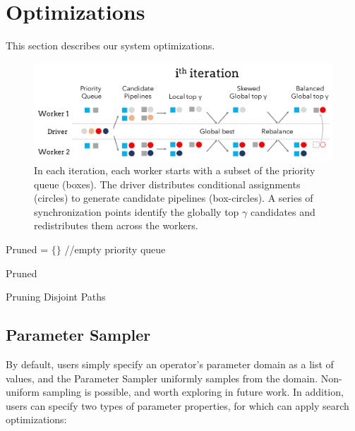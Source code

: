 \section{Optimizations}\label{s:search}
This section describes our system optimizations.

\begin{figure}[t]
    \centering
    \includegraphics[width=\columnwidth]{figures/distributed.pdf}
    \caption{In each iteration, each worker starts with a subset of the priority queue (boxes).  The driver distributes conditional assignments (circles) to generate candidate pipelines (box-circles).  A series of synchronization points identify the globally top $\gamma$ candidates and redistributes them across the workers.   \label{fig:algo}}
\end{figure}


{
\begin{algorithm}[t]

 Pruned = $\{\}$  //empty priority queue



\Return Pruned
\caption{Pruning Disjoint Paths}
\label{alg:pruning}
\end{algorithm}
}


\subsection{Parameter Sampler}
By default, users simply specify an operator's parameter domain as a list of values, and the Parameter Sampler uniformly samples from the domain. Non-uniform sampling is possible, and worth exploring in future work.   In addition, users can specify two types of parameter properties, for which \sys can apply search optimizations:

